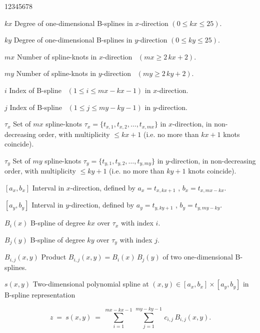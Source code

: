 \begin{DL}{12345678}
\item[$kx$] Degree of one-dimensional B-splines in $x$-direction
 $(0 \le kx \le 25)$.
\item[$ky$] Degree of one-dimensional B-splines in $y$-direction
 $(0 \le ky \le 25)$.
\item[$mx$] Number of spline-knots in $x$-direction \,
 $(mx \ge 2 \, kx+2)$.
\item[$my$] Number of spline-knots in $y$-direction \,
 $(my \ge 2 \, ky+2)$.
\item[$i$] Index of B-spline \, $(1 \le i \le mx-kx-1)$ in
 $x$-direction.
\item[$j$] Index of B-spline \, $(1 \le j \le my-ky-1)$ in
 $y$-direction.
\item[$\tau_x$] Set of $mx$ spline-knots
 $\tau_x = \{ t_{x,1},t_{x,2}, \ldots ,t_{x,mx}\}$ in $x$-direction,
 in non-decreasing order, with multiplicity $\le kx+1$
 (i.e. no more than $kx+1$ knots coincide).
\item[$\tau_y$] Set of $my$ spline-knots
 $\tau_y = \{ t_{y,1},t_{y,2}, \ldots ,t_{y,my}\}$ in $y$-direction,
 in non-decreasing order, with multiplicity  $\le ky+1$
 (i.e. no more than $ky+1$ knots coincide).
\item[{$[a_x,b_x]$}] Interval in $x$-direction,
 defined by $a_x=t_{x,kx+1}$ , $b_x=t_{x,mx-kx}$.
\item[{$[a_y,b_y]$}] Interval in $y$-direction,
 defined by $a_y=t_{y,ky+1}$ , $b_y=t_{y,my-ky}$.
\item[$B_i(x)$] B-spline of degree $kx$ over $\tau_x$ with index $i$.
\item[$B_j(y)$] B-spline of degree $ky$ over $\tau_y$ with index $j$.
\item[$B_{i,j}(x,y)$] Product $B_{i,j}(x,y) = B_i(x) \, B_j(y)$ of
 two one-dimensional B-splines.
\item[$s(x,y)$] Two-dimensional polynomial spline at
 $(x,y) \in [a_x,b_x] \times [a_y,b_y]$
 in B-spline representation
\end{DL}
$$ z \ = \ s(x,y) \ = \ \sum_{i=1}^{mx-kx-1}\,\sum_{j=1}^{my-ky-1}\,
c_{i,j}\,B_{i,j}(x,y).$$
 
